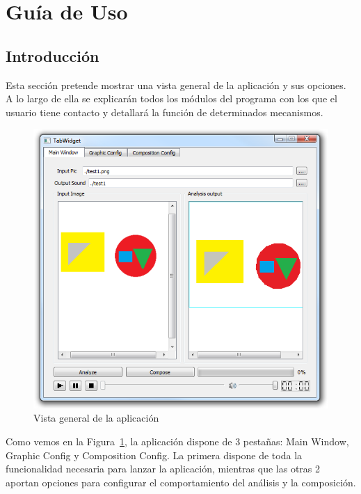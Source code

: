 \section{Guía de Uso}

	\subsection{Introducción}
		
		Esta sección pretende mostrar una vista general de la aplicación y sus opciones. A lo largo de ella se explicarán todos los módulos del programa con los que el usuario tiene contacto y detallará la función de determinados mecanismos.\\
		
		\begin{figure}[htbp]
		\centering
		\includegraphics[scale=0.57]{graphics/interfazoverview.png}
		\caption{Vista general de la aplicación}
		\label{fig:interfazoverview}
		\end{figure}
		
		Como vemos en la Figura~\ref{fig:interfazoverview}, la aplicación dispone de 3 pestañas: Main Window, Graphic Config y Composition Config. La primera dispone de toda la funcionalidad necesaria para lanzar la aplicación, mientras que las otras 2 aportan opciones para configurar el comportamiento del análisis y la composición.\\
		
